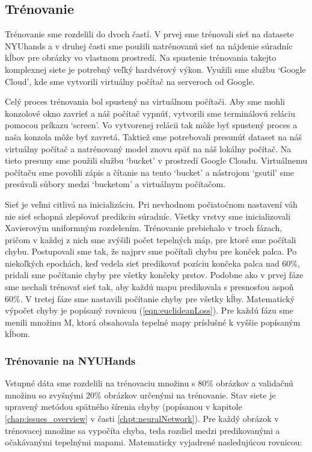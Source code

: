 \subsection{Trénovanie}
Trénovanie sme rozdelili do dvoch častí. V prvej sme trénovali sieť na datasete NYUhands a v druhej časti sme použili natrénovanú sieť na nájdenie súradníc kĺbov pre obrázky vo vlastnom prostredí. Na spustenie trénovania takejto komplexnej siete je potrebný veľký hardvérový výkon. Využili sme službu `Google Cloud', kde sme vytvorili virtuálny počítač na serveroch od Google. 

Celý proces trénovania bol spustený na virtuálnom počítači. Aby sme mohli konzolové okno zavrieť a náš počítač vypnúť, vytvorili sme terminálovú reláciu pomocou príkazu `screen'. Vo vytvorenej relácii tak môže byť spustený proces a naša konzola môže byť zavretá. Taktiež sme potrebovali presunúť dataset na náš virtuálny počítač a natrénovaný model znovu späť na náš lokálny počítač. Na tieto presuny sme použili službu `bucket' v prostredí Google Cloudu. Virtuálnemu počítaču sme povolili zápis a čítanie na tento `bucket' a nástrojom `gsutil' sme presúvali súbory medzi `bucketom' a virtuálnym počítačom.

Sieť je veľmi citlivá na inicializáciu. Pri nevhodnom počiatočnom nastavení váh nie sieť schopná zlepšovať predikciu súradníc. Všetky vrstvy sme inicializovali Xavierovým \cite{glorot2010understanding} uniformným rozdelením. Trénovanie prebiehalo v troch fázach, pričom v každej z nich sme zvýšili počet tepelných máp, pre ktoré sme počítali chybu. Postupovali sme tak, že najprv sme počítali chybu pre konček palca. Po niekoľkých epochách, keď vedela sieť predikovať pozíciu končeka palca nad 60\%, pridali sme počítanie chyby pre všetky končeky prstov. Podobne ako v prvej fáze sme nechali trénovať sieť tak, aby každú mapu predikovala s presnosťou aspoň 60\%. V tretej fáze sme nastavili počítanie chyby pre všetky kĺby. Matematický výpočet chyby je popísaný rovnicou (\ref{eqn:euclideanLoss}). Pre každú fázu sme menili množinu M, ktorá obsahovala tepelné mapy príslušné k vyššie popísaným kĺbom. 

\subsubsection{Trénovanie na NYUHands}
Vstupné dáta sme rozdelili na trénovaciu množinu s 80\% obrázkov a validačnú množinu so zvyšnými 20\% obrázkov určenými na trénovanie. Stav siete je upravený metódou spätného šírenia chyby (popísanou v kapitole \ref{chap:issues_overview} v časti \ref{chpt:neuralNetwork}). Pre každý obrázok v trénovacej množine sa vypočíta chyba, teda rozdiel medzi predikovanými a očakávanými tepelnými mapami. Matematicky vyjadrené nasledujúcou rovnicou:

